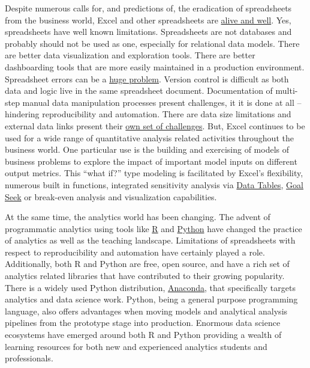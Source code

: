 \documentclass[ited,blindrev]{informs3}              %
\begin{document}
Despite numerous calls for, and predictions of, the eradication of spreadsheets from the business world, Excel and other spreadsheets are \href{https://benn.substack.com/p/the-next-billion-programmers}{alive and well}. Yes, spreadsheets have well known limitations. Spreadsheets are not databases and probably should not be used as one, especially for relational data models. There are better data visualization and exploration tools. There are better dashboarding tools that are more easily maintained in a production environment. Spreadsheet errors can be a \href{https://eusprig.org/research-info/horror-stories/}{huge problem}. Version control is difficult as both data and logic live in the same spreadsheet document. Documentation of multi-step manual data manipulation processes present challenges, it it is done at all -- hindering reproducibility and automation. There are data size limitations and external data links present their \href{https://www.thespreadsheetguru.com/find-remove-external-links/}{own set of challenges}. But, Excel continues to be used for a wide range of quantitative analysis related activities throughout the business world. One particular use is the building and exercising of models of business problems
to explore the impact of important model inputs on different output metrics. This ``what if?'' type modeling is facilitated by Excel's flexibility, numerous built in functions, integrated sensitivity analysis via \href{https://support.microsoft.com/en-us/office/calculate-multiple-results-by-using-a-data-table-e95e2487-6ca6-4413-ad12-77542a5ea50b}{Data Tables},  \href{https://support.microsoft.com/en-us/office/use-goal-seek-to-find-the-result-you-want-by-adjusting-an-input-value-320cb99e-f4a4-417f-b1c3-4f369d6e66c7}{Goal
	Seek} or break-even analysis and visualization capabilities. 

At the same time, the analytics world has been changing. The advent of programmatic analytics using tools like \href{https://www.r-project.org/}{R} and \href{https://www.python.org/}{Python} have changed the practice of analytics as well as the teaching landscape. Limitations of spreadsheets with respect to reproducibility and automation have certainly played a role.  Additionally, both R and Python are free, open source, and have a rich set of analytics related libraries that have contributed to their growing popularity. There is a widely used Python distribution, \href{https://www.anaconda.com/download}{Anaconda}, that specifically targets analytics and data science work. Python, being a general purpose programming language, also offers advantages when moving models and analytical analysis pipelines from the prototype stage into production. Enormous data science ecosystems have emerged around both R and Python providing a wealth of learning resources for both new and experienced analytics students and professionals.
\end{document}

